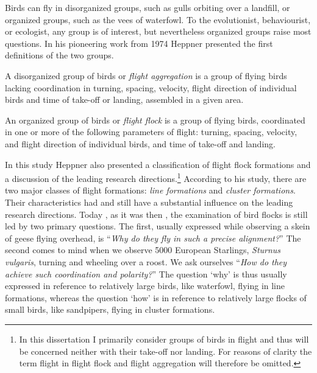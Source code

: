 Birds can fly in disorganized groups, such as gulls orbiting over a landfill, or organized groups, such as the vees of waterfowl. To the evolutionist, behaviourist, or ecologist, any group is of interest, but nevertheless organized groups raise most questions. In his pioneering work from 1974 Heppner \cite{heppner:1974a} presented the first definitions of the two groups. 

\begin{definition}
\label{def:aggregation}
A disorganized group of birds or \emph{flight aggregation} is a group of flying birds lacking coordination in turning, spacing, velocity, flight direction of individual birds and time of take-off or landing, assembled in a given area.
\end{definition}

\begin{definition}
\label{def:flock}
An organized group of birds or \emph{flight flock} is a group of flying birds, coordinated in one or more of the following parameters of flight: turning, spacing, velocity, and flight direction of individual birds, and time of take-off and landing.  
\end{definition}

In this study Heppner also presented a classification of flight flock formations and a discussion of the leading research directions.\footnote{In this dissertation I primarily consider groups of birds in flight and thus will be concerned neither with their take-off nor landing. For reasons of clarity the term flight in flight flock and flight aggregation will therefore be omitted.} According to his study, there are two major classes of flight formations: \emph{line formations} and \emph{cluster formations}. Their characteristics had and still have a substantial influence on the leading research directions. Today \cite{heppner:1997,parrish:1997a}, as it was then \cite{heppner:1974a}, the examination of bird flocks is still led by two primary questions. The first, usually expressed while observing a skein of geese flying overhead, is ``\emph{Why do they fly in such a precise alignment?}'' The second comes to mind when we observe 5000 European Starlings, \emph{Sturnus vulgaris}, turning and wheeling over a roost. We ask ourselves ``\emph{How do they achieve such coordination and polarity?}'' The question `why' is thus usually expressed in reference to relatively large birds, like waterfowl, flying in line formations, whereas the question `how' is in reference to relatively large flocks of small birds, like sandpipers, flying in cluster formations. 

